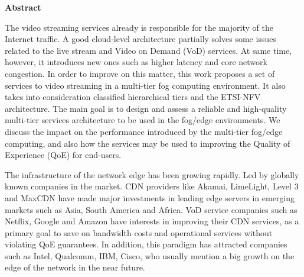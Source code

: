 \begin{center}
	{\bf Abstract}
\end{center}
	
	The video streaming services already is responsible for the majority of the Internet traffic. A good cloud-level architecture partially solves some issues related to the live stream and Video on Demand (VoD) services.  At same time, however, it introduces new ones such as higher latency and core network congestion. In order to improve on this matter, this work proposes a set of services to video streaming in a multi-tier fog computing environment. It also takes into consideration classified hierarchical tiers and the ETSI-NFV architecture.
The main goal is to design and assess a reliable and high-quality multi-tier services architecture to be used in the fog/edge environments.
We discuss the impact on the performance introduced by the multi-tier fog/edge computing, and also how the services may be used to improving the Quality of Experience (QoE) for end-users.
	
	The infrastructure of the network edge has been growing rapidly. Led by globally known companies in the market. CDN providers like Akamai, LimeLight, Level 3 and MaxCDN have made major investments in leading edge servers in emerging markets such as Asia, South America and Africa. VoD service companies such as Netflix, Google and Amazon have interests in improving their CDN services, as a primary goal to save on bandwidth costs and operational services without violating QoE guarantees. In addition, this paradigm has attracted companies such as Intel, Qualcomm, IBM, Cisco, who usually mention a big growth on the edge of the network in the near future.

